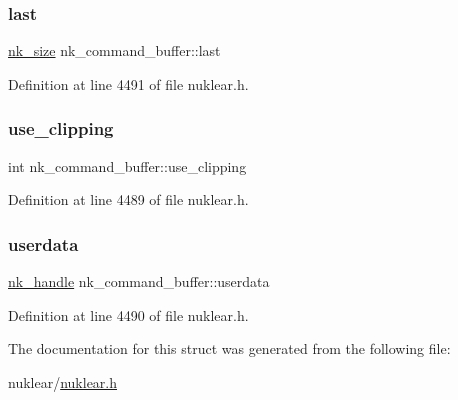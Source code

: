 \subsubsection{\texorpdfstring{last}{last}}
{\footnotesize\ttfamily \mbox{\hyperlink{nuklear_8h_a84c0fc50dec5501be327b33d41d9010c}{nk\+\_\+size}} nk\+\_\+command\+\_\+buffer\+::last}



Definition at line 4491 of file nuklear.\+h.

\mbox{\label{structnk__command__buffer_a65f789788b8a857efa0c4080781591f7}} 
\subsubsection{\texorpdfstring{use\+\_\+clipping}{use\_clipping}}
{\footnotesize\ttfamily int nk\+\_\+command\+\_\+buffer\+::use\+\_\+clipping}



Definition at line 4489 of file nuklear.\+h.

\mbox{\label{structnk__command__buffer_adc12ff0f2c3965f2df8da6d83c5b9903}} 
\subsubsection{\texorpdfstring{userdata}{userdata}}
{\footnotesize\ttfamily \mbox{\hyperlink{unionnk__handle}{nk\+\_\+handle}} nk\+\_\+command\+\_\+buffer\+::userdata}



Definition at line 4490 of file nuklear.\+h.



The documentation for this struct was generated from the following file\+:\begin{DoxyCompactItemize}
\item 
nuklear/\mbox{\hyperlink{nuklear_8h}{nuklear.\+h}}\end{DoxyCompactItemize}
